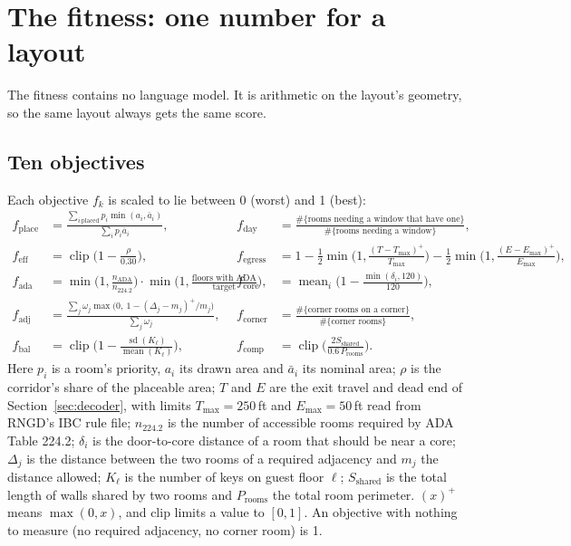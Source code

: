 \documentclass[10pt,a4paper]{article}
\begin{document}
\section{The fitness: one number for a layout}\label{sec:fitness}
The fitness contains no language model. It is arithmetic on the layout's geometry, so the same layout always gets the
same score.

\subsection{Ten objectives}
Each objective $f_k$ is scaled to lie between 0 (worst) and 1 (best):
\begingroup\footnotesize
\begin{align*}
f_{\text{place}} &= \frac{\sum_{i\ \text{placed}} p_i \min(a_i, \bar a_i)}{\sum_{i} p_i \bar a_i}, &
f_{\text{day}} &= \frac{\#\{\text{rooms needing a window that have one}\}}{\#\{\text{rooms needing a window}\}}, \\
f_{\text{eff}} &= \operatorname{clip}\!\Big(1 - \frac{\rho}{0.30}\Big), &
f_{\text{egress}} &= 1 - \tfrac12 \min\!\Big(1, \frac{(T - T_{\max})^+}{T_{\max}}\Big) - \tfrac12 \min\!\Big(1, \frac{(E - E_{\max})^+}{E_{\max}}\Big), \\
f_{\text{ada}} &= \min\!\Big(1, \frac{n_{\text{ADA}}}{n_{224.2}}\Big)\cdot\min\!\Big(1, \frac{\text{floors with ADA}}{\text{target}}\Big), &
f_{\text{core}} &= \operatorname{mean}_i \Big(1 - \frac{\min(\delta_i, 120)}{120}\Big), \\
f_{\text{adj}} &= \frac{\sum_j \omega_j \max\big(0,\ 1 - (\Delta_j - m_j)^+/m_j\big)}{\sum_j \omega_j}, &
f_{\text{corner}} &= \frac{\#\{\text{corner rooms on a corner}\}}{\#\{\text{corner rooms}\}}, \\
f_{\text{bal}} &= \operatorname{clip}\!\Big(1 - \frac{\operatorname{sd}(K_\ell)}{\operatorname{mean}(K_\ell)}\Big), &
f_{\text{comp}} &= \operatorname{clip}\!\Big(\frac{2 S_{\text{shared}}}{0.6\, P_{\text{rooms}}}\Big).
\end{align*}
\endgroup
Here $p_i$ is a room's priority, $a_i$ its drawn area and $\bar a_i$ its nominal area; $\rho$ is the corridor's share of
the placeable area; $T$ and $E$ are the exit travel and dead end of Section~\ref{sec:decoder}, with limits
$T_{\max} = 250$\,ft and $E_{\max} = 50$\,ft read from RNGD's IBC rule file; $n_{224.2}$ is the number of
accessible rooms required by ADA Table 224.2; $\delta_i$ is the door-to-core distance of a room that should be near a
core; $\Delta_j$ is the distance between the two rooms of a required adjacency and $m_j$ the distance allowed;
$K_\ell$ is the number of keys on guest floor $\ell$; $S_{\text{shared}}$ is the total length of walls shared by two
rooms and $P_{\text{rooms}}$ the total room perimeter. $(x)^+$ means $\max(0, x)$, and clip limits a value to $[0, 1]$.
An objective with nothing to measure (no required adjacency, no corner room) is 1.
\end{document}
